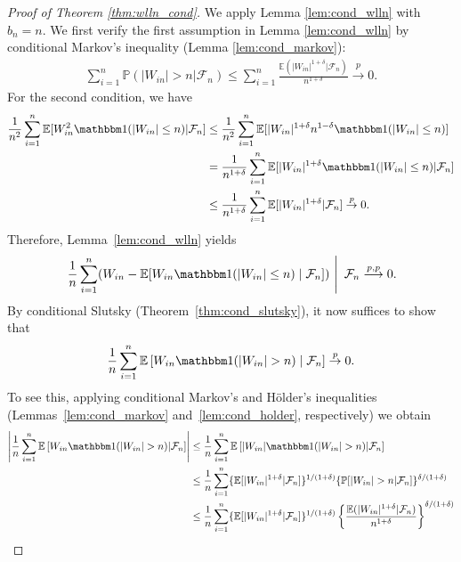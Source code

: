 \documentclass[12pt]{article}
\makeatletter
\theoremstyle{definition}
\theoremstyle{remark}
\newcommand\newtarget[2]{\Hy@raisedlink{\hypertarget{#1}{}}#2}
\newcommand{\E}{\mathbb E}								%
\renewcommand{\P}{\mathbb{P}}							%
\newcommand{\indicator}{\mathbbm 1}						%
\newcommand{\convp}{\overset p \rightarrow}             %
\newcommand{\convpp}{\overset {p,p} \longrightarrow}    %
\makeatother
\begin{document}
	
	\begin{proof}[Proof of Theorem \ref{thm:wlln_cond}] \newtarget{proof:thm:wlln_cond}{}
		We apply Lemma \ref{lem:cond_wlln} with $b_n=n$. We first verify the first assumption in Lemma \ref{lem:cond_wlln} by conditional Markov's inequality (Lemma \ref{lem:cond_markov}):
		\begin{align*}
			\sum_{i=1}^n\P(|W_{in}|>n|\mathcal{F}_n)\leq \sum_{i=1}^n\frac{\E(|W_{in}|^{1+\delta}|\mathcal{F}_n)}{n^{1+\delta}}\convp0.
		\end{align*}
		For the second condition, we have
		\begin{align*}
			\frac{1}{n^{2}}\sum_{i=1}^n\E[W_{in}^2\indicator(|W_{in}|\leq n)|\mathcal{F}_n]
			&
			\leq \frac{1}{n^2}\sum_{i=1}^n\E[|W_{in}|^{1+\delta}n^{1-\delta}\indicator(|W_{in}|\leq n)]\\
			&
			= \frac{1}{n^{1+\delta}}\sum_{i=1}^n\E[|W_{in}|^{1+\delta}\indicator(|W_{in}|\leq n)|\mathcal{F}_n]\\
			&
			\leq \frac{1}{n^{1+\delta}}\sum_{i=1}^n\E[|W_{in}|^{1+\delta}|\mathcal{F}_n]\convp0.
		\end{align*}
		Therefore, Lemma~\ref{lem:cond_wlln} yields
		\begin{align*}
			\left.\frac1n\sum_{i=1}^n (W_{in}-\E[W_{in}\indicator(|W_{in}|\leq n) \mid \mathcal{F}_n]) \ \right|\ \mathcal{F}_n \convpp 0.
		\end{align*}
		By conditional Slutsky (Theorem~\ref{thm:cond_slutsky}), it now suffices to show that
		\begin{align*}
			\frac{1}{n}\sum_{i=1}^n\E\left[W_{in}\indicator(|W_{in}| > n) \mid \mathcal{F}_n\right] \convp 0.
		\end{align*}
		To see this, applying conditional Markov's and H\"older's inequalities (Lemmas~\ref{lem:cond_markov} and~\ref{lem:cond_holder}, respectively) we obtain
		\begin{align*}
			\left|\frac{1}{n}\sum_{i=1}^n\E\left[W_{in}\indicator(|W_{in}| > n)|\mathcal{F}_n\right]\right|
			&
			\leq \frac{1}{n}\sum_{i=1}^n\E\left[|W_{in}|\indicator(|W_{in}| > n)|\mathcal{F}_n\right]\\
			&
			\leq\frac{1}{n}\sum_{i=1}^n\{\E[|W_{in}|^{1+\delta}|\mathcal{F}_n]\}^{1/(1+\delta)}\{\P[|W_{in}|>n|\mathcal{F}_n]\}^{\delta/(1+\delta)} \\
			&
			\leq \frac{1}{n}\sum_{i=1}^n\{\E[|W_{in}|^{1+\delta}|\mathcal{F}_n]\}^{1/(1+\delta)}\left\{\frac{\E(|W_{in}|^{1+\delta}|\mathcal{F}_n)}{n^{1+\delta}}\right\}^{\delta/(1+\delta)}\\

\end{align*}
\end{proof}
\end{document}
